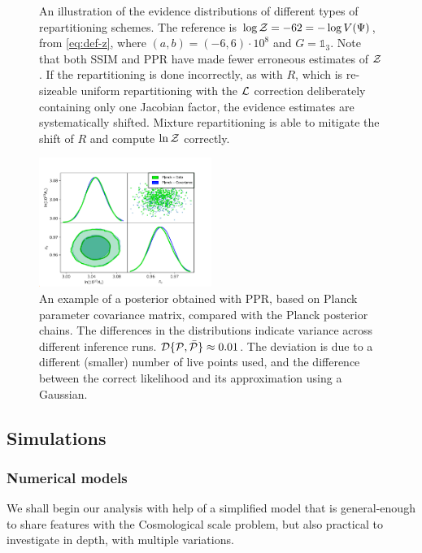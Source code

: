 \documentclass[usenatbib]{mnras}
\begin{document}
\begin{figure}

\caption{An illustration of the evidence distributions of different
  types of repartitioning schemes. The reference is
  \(\log {\cal Z} = -62 = - \log V(\Psi)\), from \cref{eq:def-z},
  where \((a,b)=(-6, 6)\cdot 10^{8}\) and \(G=\mathds{1}_{3}\). Note
  that both SSIM and PPR have made fewer erroneous estimates of ${\cal
    Z}$. If the repartitioning is done incorrectly, as with $R$, which
  is re-sizeable uniform repartitioning with the ${\cal L}$ correction
  deliberately containing only one Jacobian factor, the evidence
  estimates are systematically shifted. Mixture repartitioning is able
  to mitigate the shift of $R$ and compute $\ln {\cal Z}$
  correctly.\label{fig:hist}}
\end{figure}




\begin{figure}
  \includegraphics[width=0.5\textwidth]{./illustrations/triangle-fit.pdf}
  \caption{An example of a posterior obtained with PPR, based on
    Planck parameter covariance matrix, compared with the Planck
    posterior chains. The differences in the distributions indicate
    variance across different inference runs.
    ${\cal D}\{ {\cal P}, \bar{\cal P}\} \approx 0.01$. The deviation
    is due to a different (smaller) number of live points used, and
    the difference between the correct likelihood and its
    approximation using a Gaussian. \label{fig:overlay-posteriors}}
\end{figure}


\subsection{Simulations}
\subsubsection{Numerical models}

We shall begin our analysis with help of a simplified model that is
general-enough to share features with the Cosmological scale problem,
but also practical to investigate in depth, with multiple variations.
\end{document}
